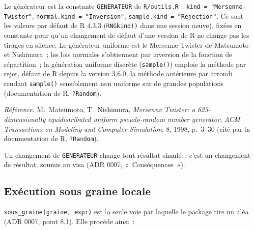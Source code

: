 \documentclass[a4paper,11pt]{article}
\newcommand{\code}[1]{\texttt{\small #1}}
\newcommand{\refl}[1]{{\small\textcolor{maincolor!70!black}{\textit{Référence.} #1}}\par\smallskip}
\begin{document}
Le générateur est la constante \code{GENERATEUR} de \code{R/outils.R}~:
\code{kind = "Mersenne-Twister"}, \code{normal.kind = "Inversion"},
\code{sample.kind = "Rejection"}. Ce sont les valeurs par défaut de R 4.3.3
(\code{RNGkind()} dans une session neuve), fixées en constante pour qu'un
changement de défaut d'une version de R ne change pas les tirages en silence.
Le générateur uniforme est le Mersenne-Twister de Matsumoto et Nishimura~; les
lois normales s'obtiennent par inversion de la fonction de répartition~; la
génération uniforme discrète (\code{sample()}) emploie la méthode par rejet,
défaut de R depuis la version 3.6.0, la méthode antérieure par arrondi rendant
\code{sample()} sensiblement non uniforme sur de grandes populations
(documentation de R, \code{?Random}).

\refl{M.~Matsumoto, T.~Nishimura, \emph{Mersenne Twister: a 623-dimensionally
equidistributed uniform pseudo-random number generator}, \emph{ACM
Transactions on Modeling and Computer Simulation}, 8, 1998, p.~3--30 (cité par
la documentation de R, \code{?Random}).}

\noindent
Un changement de \code{GENERATEUR} change tout résultat simulé~: c'est un
changement de résultat, soumis au visa (ADR 0007, «~Conséquences~»).

\subsection{Exécution sous graine locale}
\label{sec:sous-graine}

\code{sous\_graine(graine, expr)} est la seule voie par laquelle le package
tire un aléa (ADR 0007, point 8.1). Elle procède ainsi~:
\end{document}
